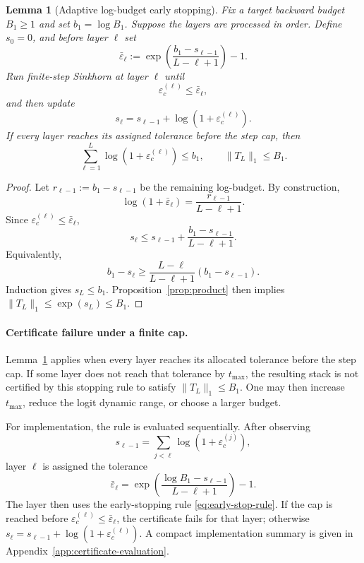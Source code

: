\documentclass[10pt]{article}
\numberwithin{equation}{section}
\theoremstyle{plain}
\newtheorem{lemma}[theorem]{Lemma}
\theoremstyle{definition}
\theoremstyle{remark}
\begin{document}
\begin{lemma}[Adaptive log-budget early stopping]\label{lem:adaptive-budget}
Fix a target backward budget $B_1\ge1$ and set $b_1=\log B_1$. Suppose the layers are processed in order. Define $s_0=0$, and before layer $\ell$ set
\begin{equation}\label{eq:adaptive-budget-target}
        \bar\varepsilon_\ell
        :=
        \exp\!\left(\frac{b_1-s_{\ell-1}}{L-\ell+1}\right)-1.
\end{equation}
Run finite-step Sinkhorn at layer $\ell$ until
\begin{equation}
        \varepsilon_c^{(\ell)}\le \bar\varepsilon_\ell,
\end{equation}
and then update
\begin{equation}
        s_\ell=s_{\ell-1}+\log(1+\varepsilon_c^{(\ell)}).
\end{equation}
If every layer reaches its assigned tolerance before the step cap, then
\begin{equation}
        \sum_{\ell=1}^L\log(1+\varepsilon_c^{(\ell)})\le b_1,
        \qquad
        \|T_L\|_1\le B_1.
\end{equation}
\end{lemma}

\begin{proof}
Let $r_{\ell-1}:=b_1-s_{\ell-1}$ be the remaining log-budget. By construction,
\[
        \log(1+\bar\varepsilon_\ell)=\frac{r_{\ell-1}}{L-\ell+1}.
\]
Since $\varepsilon_c^{(\ell)}\le\bar\varepsilon_\ell$,
\[
        s_\ell
        \le
        s_{\ell-1}+\frac{b_1-s_{\ell-1}}{L-\ell+1}.
\]
Equivalently,
\[
        b_1-s_\ell
        \ge
        \frac{L-\ell}{L-\ell+1}(b_1-s_{\ell-1}).
\]
Induction gives $s_L\le b_1$. Proposition~\ref{prop:product} then implies $\|T_L\|_1\le\exp(s_L)\le B_1$.
\end{proof}

\paragraph{Certificate failure under a finite cap.}
Lemma~\ref{lem:adaptive-budget} applies when every layer reaches its allocated
tolerance before the step cap. If some layer does not reach that tolerance by
\(t_{\max}\), the resulting stack is not certified by this stopping rule to
satisfy \(\|T_L\|_1\le B_1\). One may then increase \(t_{\max}\), reduce the
logit dynamic range, or choose a larger budget.

For implementation, the rule is evaluated sequentially. After observing
\[
s_{\ell-1}=\sum_{j<\ell}\log(1+\varepsilon_c^{(j)}),
\]
layer \(\ell\) is assigned the tolerance
\begin{equation}\label{eq:adaptive-budget-implementation-target}
\bar\varepsilon_\ell
=
\exp\left(
\frac{\log B_1-s_{\ell-1}}{L-\ell+1}
\right)-1 .
\end{equation}
The layer then uses the early-stopping rule \eqref{eq:early-stop-rule}. If the cap is reached before
\(\varepsilon_c^{(\ell)}\le \bar\varepsilon_\ell\), the certificate fails for that layer; otherwise
\(s_\ell=s_{\ell-1}+\log(1+\varepsilon_c^{(\ell)})\). A compact implementation summary is
given in Appendix~\ref{app:certificate-evaluation}.
\end{document}
